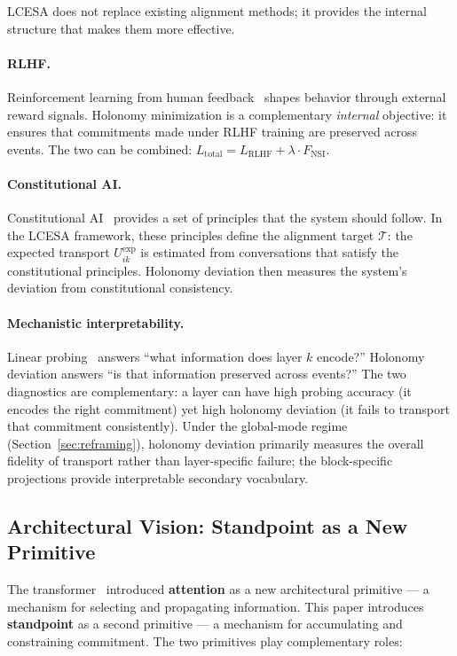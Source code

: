 LCESA does not replace existing alignment methods; it provides the internal structure
that makes them more effective.

\paragraph{RLHF.}
Reinforcement learning from human feedback~\cite{ouyang2022training} shapes behavior
through external reward signals. Holonomy minimization is a complementary
\emph{internal} objective: it ensures that commitments made under RLHF training are
preserved across events. The two can be combined: $L_{\mathrm{total}} =
L_{\mathrm{RLHF}} + \lambda \cdot F_{\mathrm{NSI}}$.

\paragraph{Constitutional AI.}
Constitutional AI~\cite{bai2022constitutional} provides a set of principles that the
system should follow. In the LCESA framework, these principles define the alignment
target $\mathcal{T}$: the expected transport $U_{ik}^{\exp}$ is estimated from
conversations that satisfy the constitutional principles. Holonomy deviation then measures
the system's deviation from constitutional consistency.

\paragraph{Mechanistic interpretability.}
Linear probing~\cite{belinkov2021probing} answers ``what information does layer $k$
encode?'' Holonomy deviation answers ``is that information preserved across events?'' The
two diagnostics are complementary: a layer can have high probing accuracy (it encodes the
right commitment) yet high holonomy deviation (it fails to transport that commitment
consistently). Under the global-mode regime (Section~\ref{sec:reframing}), holonomy
deviation primarily measures the overall fidelity of transport rather than layer-specific
failure; the block-specific projections provide interpretable secondary vocabulary.

\subsection{Architectural Vision: Standpoint as a New Primitive}

The transformer~\cite{vaswani2017attention} introduced \textbf{attention} as a new
architectural primitive --- a mechanism for selecting and propagating information. This
paper introduces \textbf{standpoint} as a second primitive --- a mechanism for
accumulating and constraining commitment. The two primitives play complementary roles:


